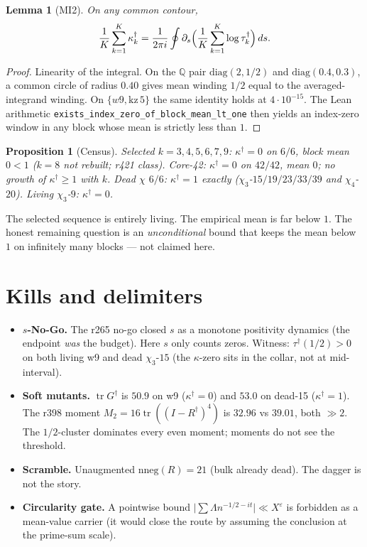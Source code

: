 \documentclass[11pt]{article}
\newtheorem{lemma}{Lemma}
\newtheorem{prop}{Proposition}
\theoremstyle{remark}
\newcommand{\Rd}{R^{\dagger}}
\newcommand{\Gd}{G^{\dagger}}
\newcommand{\taud}{\tau^{\dagger}}
\newcommand{\kapd}{\kappa^{\dagger}}
\begin{document}
\begin{lemma}[MI2]\label{lem:mi2}
On any common contour,
\[
\frac1K\sum_{k=1}^{K}\kapd_{k}
=\frac1{2\pi i}\oint\partial_{s}\Bigl(\frac1K\sum_{k=1}^{K}\log\taud_{k}\Bigr)\,ds.
\]
\end{lemma}

\begin{proof}
Linearity of the integral.  On the $\mathbb{Q}$ pair
$\mathrm{diag}(2,1/2)$ and $\mathrm{diag}(0.4,0.3)$, a common
circle of radius $0.40$ gives mean winding $1/2$ equal to the
averaged-integrand winding.  On $\{w9,\mathrm{kz}\,5\}$ the
same identity holds at $4\cdot 10^{-15}$.
The Lean arithmetic
\texttt{exists\_index\_zero\_of\_block\_mean\_lt\_one}
then yields an index-zero window in any block whose mean is
strictly less than $1$.
\end{proof}

\begin{prop}[Census]\label{prop:census}
Selected $k=3,4,5,6,7,9$: $\kapd=0$ on $6/6$, block mean $0<1$
($k=8$ not rebuilt; r421 class).
Core-42: $\kapd=0$ on $42/42$, mean $0$; no growth of
$\kapd\ge 1$ with $k$.
Dead $\chi$ $6/6$: $\kapd=1$ exactly
($\chi_{3}$-$15/19/23/33/39$ and $\chi_{4}$-$20$).
Living $\chi_{3}$-$9$: $\kapd=0$.
\end{prop}

The selected sequence is entirely living.  The empirical mean
is far below $1$.  The honest remaining question is an
\emph{unconditional} bound that keeps the mean below $1$ on
infinitely many blocks --- not claimed here.

\section{Kills and delimiters}\label{sec:kills}

\begin{itemize}
\item \textbf{$s$-No-Go.}
The r265 no-go closed $s$ as a monotone positivity dynamics
(the endpoint \emph{was} the budget).  Here $s$ only counts
zeros.  Witness: $\taud(1/2)>0$ on both living w9 and dead
$\chi_{3}$-$15$ (the $\kappa$-zero sits in the collar, not at
mid-interval).
\item \textbf{Soft mutants.}
$\operatorname{tr}\Gd$ is $50.9$ on w9 ($\kapd=0$) and $53.0$
on dead-15 ($\kapd=1$).  The r398 moment
$M_{2}=16\operatorname{tr}((I-\Rd)^{4})$ is $32.96$ vs $39.01$,
both $\gg 2$.  The $1/2$-cluster dominates every even moment;
moments do not see the threshold.
\item \textbf{Scramble.}
Unaugmented $\mathrm{nneg}(R)=21$ (bulk already dead).  The
dagger is not the story.
\item \textbf{Circularity gate.}
A pointwise bound $\lvert\sum\Lambda n^{-1/2-it}\rvert\ll X^{\varepsilon}$
is forbidden as a mean-value carrier (it would close the route
by assuming the conclusion at the prime-sum scale).
\end{itemize}
\end{document}

